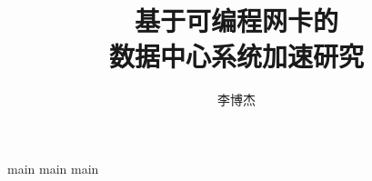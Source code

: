 \documentclass[doctor]{ustcthesis}
\title{基于可编程网卡的\\数据中心系统加速研究}
\author{李博杰}
\begin{document}
%

\maketitle
\makestatement

\frontmatter

\tableofcontents


\mainmatter


{main}
{main}
{main}







%

\backmatter


\end{document}
